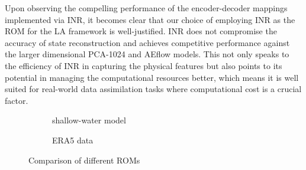 \documentclass{article}
\begin{document}
Upon observing the compelling performance of the encoder-decoder mappings implemented via INR, it becomes clear that our choice of employing INR as the ROM for the LA framework is well-justified. INR does not compromise the accuracy of state reconstruction and achieves competitive performance against the larger dimensional PCA-1024 and AEflow models. This not only speaks to the efficiency of INR in capturing the physical features but also points to its potential in managing the computational resources better, which means it is well suited for real-world data assimilation tasks where computational cost is a crucial factor.
\begin{figure}
	\centering
	\begin{subfigure}{.4\textwidth}
		\begin{adjustbox}{width=\textwidth}
			
		\end{adjustbox}
		\caption{shallow-water model}
	\end{subfigure}
	\begin{subfigure}{.4\textwidth}
		\begin{adjustbox}{width=\textwidth}
			
		\end{adjustbox}
		\caption{ERA5 data}
	\end{subfigure}
	\caption{Comparison of different ROMs}
	\label{fig:comp_eff}
\end{figure}
\end{document}
